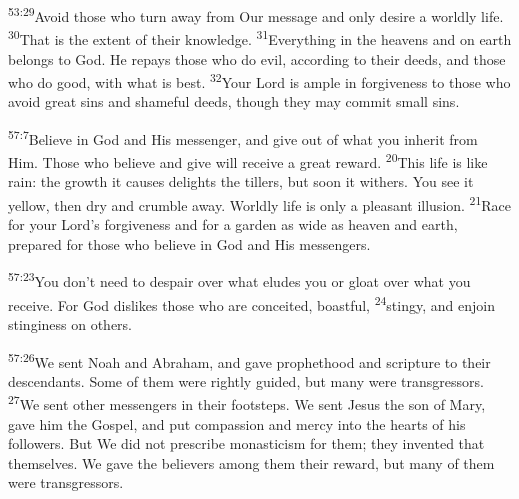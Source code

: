 \documentclass[openany,12pt,english]{book}
\newenvironment{para}{\par\pretolerance=100\tolerance=200\setlength{\emergencystretch}{0.6em}\relax}{\par}
\begin{document}
\bigskip{}

\begin{para}
    \textsuperscript{53:29}\thinspace{}A\-void those who turn a\-way from Our mes\-sage and on\-ly de\-sire a world\-ly life.
    \textsuperscript{30}\thinspace{}That is the ex\-tent of their knowl\-edge.
    \textsuperscript{31}\thinspace{}Eve\-ry\-thing in the heavens and on earth belongs to God. He repays those who do evil, ac\-cord\-ing to their deeds, and those who do good, with what is best.
    \textsuperscript{32}\thinspace{}Your Lord is am\-ple in for\-give\-ness to those who a\-void great sins and shame\-ful deeds, though they may com\-mit small sins.
\end{para}

\bigskip{}

\begin{para}
    \textsuperscript{57:7}\thinspace{}Be\-lieve in God and His mes\-sen\-ger, and give out of what you in\-her\-it from Him. Those who be\-lieve and give will re\-ceive a great re\-ward. 
    \textsuperscript{20}\thinspace{}This life is like rain: the growth it causes delights the tillers, but soon it with\-ers. You see it yel\-low, then dry and crum\-ble a\-way. World\-ly life is on\-ly a pleas\-ant il\-lu\-sion.
    \textsuperscript{21}\thinspace{}Race for your Lord's for\-give\-ness and for a gar\-den as wide as heav\-en and earth, pre\-pared for those who be\-lieve in God and His messengers.
\end{para}

\begin{para}
    \textsuperscript{57:23}\thinspace{}You don't need to de\-spair over what eludes you or gloat over what you re\-ceive. For God dislikes those who are con\-ceit\-ed, boast\-ful,
    \textsuperscript{24}\thinspace{}stin\-gy, and en\-join stin\-gi\-ness on others.
\end{para}

\begin{para}
    \textsuperscript{57:26}\thinspace{}We sent No\-ah and Abraham, and gave prophethood and scrip\-ture to their descendants. Some of them were right\-ly guid\-ed, but man\-y were transgressors.
    \textsuperscript{27}\thinspace{}We sent oth\-er messengers in their footsteps. We sent Jesus the son of Mar\-y, gave him the Gos\-pel, and put com\-pas\-sion and mer\-cy in\-to the hearts of his followers. But We did not pre\-scribe mo\-nas\-ti\-cism for them; they invented that them\-selves. We gave the believers a\-mong them their re\-ward, but man\-y of them were transgressors.
\end{para}
\end{document}
